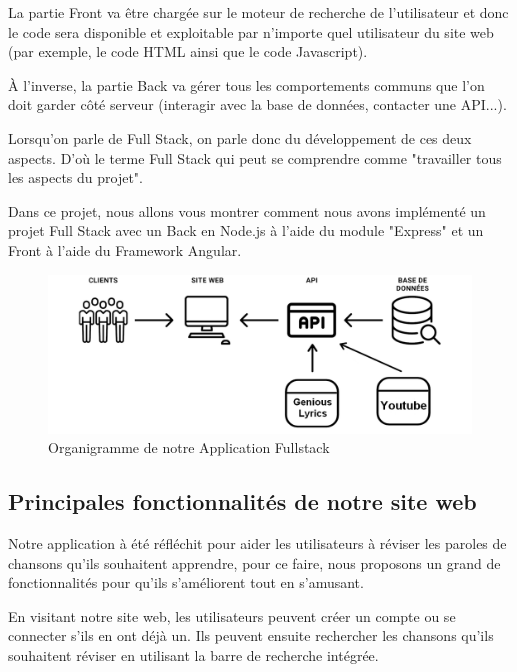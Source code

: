 \documentclass[12pt,french]{article}
\begin{document}
\medskip

La partie \gls{Front} va être chargée sur le moteur de recherche de l'utilisateur et donc le code sera disponible et exploitable par n'importe quel utilisateur du site web (par exemple, le code \gls{HTML} ainsi que le code \gls{Javascript}).

\medskip

À l'inverse, la partie \gls{Back} va gérer tous les comportements communs que l'on doit garder côté serveur (interagir avec la base de données, contacter une \gls{API}...).

\medskip

Lorsqu'on parle de Full Stack, on parle donc du développement de ces deux aspects. D'où le terme Full Stack qui peut se comprendre comme "travailler tous les aspects du projet".

\medskip

Dans ce projet, nous allons vous montrer comment nous avons implémenté un projet Full Stack avec un \gls{Back} en Node.js à l'aide du module "Express" et un \gls{Front} à l'aide du \gls{Framework} Angular.

\begin{figure}[H]
	\centering
	\includegraphics[scale=0.4]{fullstack.png}
	\caption{Organigramme de notre Application Fullstack}    
\end{figure}

\subsection{Principales fonctionnalités de notre site web}

Notre application à été réfléchit pour aider les utilisateurs à réviser les paroles de chansons qu'ils souhaitent apprendre, pour ce faire, nous proposons un grand de fonctionnalités pour qu'ils s'améliorent tout en s'amusant.
\newline 

En visitant notre site web, les utilisateurs peuvent créer un compte ou se connecter s'ils en ont déjà un. Ils peuvent ensuite rechercher les chansons qu'ils souhaitent réviser en utilisant la barre de recherche intégrée.
\newline 
\end{document}
